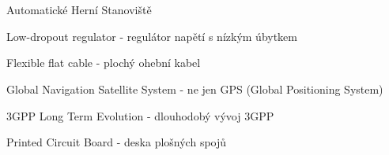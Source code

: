 \cleardoublepage
\chapter*{\listofabbrevname}
{}

\begin{acronym}[KolikMista]

		{Automatické Herní Stanoviště}

		{Low-dropout regulator - regulátor napětí s nízkým úbytkem}

		{Flexible flat cable - plochý ohební kabel}					%

		{Global Navigation Satellite System - ne jen GPS (Global Positioning System)}
	
		{3GPP Long Term Evolution - dlouhodobý vývoj 3GPP}

		{Printed Circuit Board - deska plošných spojů}    %


\end{acronym}
